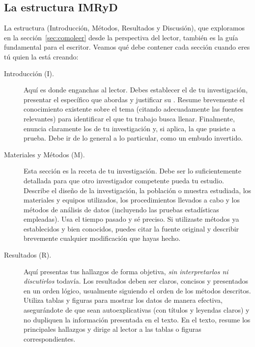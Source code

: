\subsection*{La estructura IMRyD}
\label{sub:imrydescritor}

La estructura  (Introducción, Métodos, Resultados y
Discusión), que exploramos en la sección~\ref{sec:comoleer} desde la
perspectiva del lector, también es la guía fundamental para el escritor.
Veamos qué debe contener cada sección cuando eres tú quien la está creando:

\begin{description}
  \item[Introducción (I).] Aquí es donde enganchas al lector.
    Debes establecer el  de tu investigación,
    presentar el  específico que abordas y justificar
    su .
    Resume brevemente el conocimiento existente sobre el tema (citando
    adecuadamente las fuentes relevantes) para identificar el  que tu trabajo busca llenar.
    Finalmente, enuncia claramente los  de tu
    investigación y, si aplica, la  que pusiste a
    prueba.
    Debe ir de lo general a lo particular, como un embudo invertido.

  \item[Materiales y Métodos (M).] Esta sección es la receta de tu
    investigación.
    Debe ser lo suficientemente detallada para que otro investigador
    competente pueda  tu estudio.
    Describe el diseño de la investigación, la población o muestra estudiada,
    los materiales y equipos utilizados, los procedimientos llevados a cabo
    y los métodos de análisis de datos (incluyendo las pruebas estadísticas
    empleadas).
    Usa el tiempo pasado y sé preciso.
    Si utilizaste métodos ya establecidos y bien conocidos, puedes citar la
    fuente original y describir brevemente cualquier modificación que hayas
    hecho.

  \item[Resultados (R).] Aquí presentas tus hallazgos de forma objetiva,
    \emph{sin interpretarlos ni discutirlos} todavía.
    Los resultados deben ser claros, concisos y presentados en un orden
    lógico, usualmente siguiendo el orden de los métodos descritos.
    Utiliza tablas y figuras para mostrar los datos de manera efectiva,
    asegurándote de que sean autoexplicativas (con títulos y leyendas
    claros) y no dupliquen la información presentada en el texto.
    En el texto, resume los principales hallazgos y dirige al lector a las
    tablas o figuras correspondientes.


\end{description}
